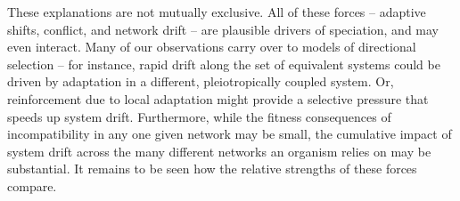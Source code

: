 \documentclass{article}
\newcommand{\1}{\mathbbm{1}}
\begin{document}
These explanations are not mutually exclusive.
All of these forces -- adaptive shifts, conflict, and network drift --
are plausible drivers of speciation, and may even interact.
Many of our observations carry over to models of directional selection --
for instance, rapid drift along the set of equivalent systems
could be driven by adaptation in a different, pleiotropically coupled system.
Or, reinforcement due to local adaptation might provide a selective pressure
that speeds up system drift.
Furthermore,
while the fitness consequences of incompatibility in any one given network may be small, 
the cumulative impact of system drift across the many different networks an organism relies on may be substantial. 
It remains to be seen how the relative strengths of these forces compare.


\end{document}
